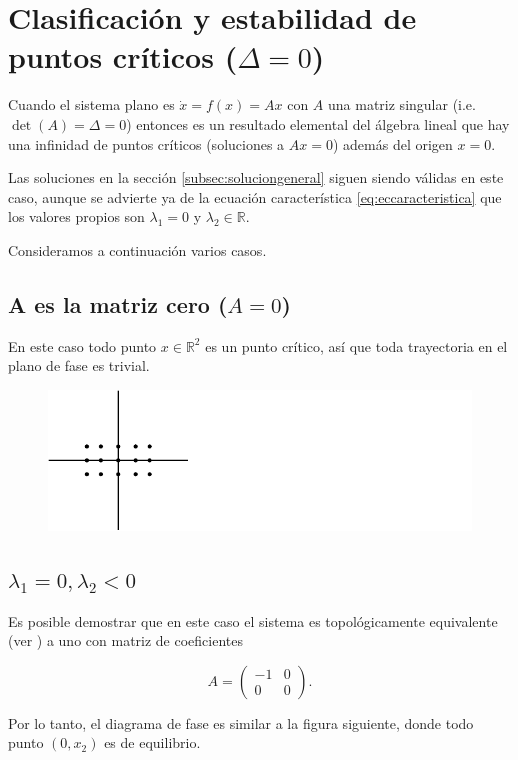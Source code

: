 \documentclass[11pt]{book}
\theoremstyle{definition}
\numberwithin{definition}{section}
\theoremstyle{theorem}
\numberwithin{theorem}{section}
\numberwithin{lemma}{section}
\numberwithin{corollary}{section}
\theoremstyle{plain}
\numberwithin{example}{section}
\newcommand{\R}{{\ensuremath{\mathbb{R}}}}
\begin{document}
\section{Clasificación y estabilidad de puntos críticos ($\Delta = 0$)}

Cuando el sistema plano es $\dot{x} = f(x) = Ax$ con $A$ una matriz singular (i.e. $\det(A) = \Delta = 0$) entonces es un resultado elemental del álgebra lineal que hay una infinidad de puntos críticos (soluciones a $Ax = 0$) además del origen $x = 0$.

Las soluciones en la sección \ref{subsec:soluciongeneral} siguen siendo válidas en este caso, aunque se advierte ya de la ecuación característica \ref{eq:eccaracteristica} que los valores propios son $\lambda_1 = 0$ y $\lambda_2 \in \R$.

Consideramos a continuación varios casos.

\subsection{A es la matriz cero ($A = 0$)}
En este caso todo punto $x \in \R^2$ es un punto crítico, así que toda trayectoria en el plano de fase es trivial.

\begin{figure}[!ht] \centering
    \includegraphics[scale=1.0]{figures/amatriz0.pdf}  
\end{figure}


\subsection{$\lambda_1 = 0, \lambda_2 < 0$}
Es posible demostrar que en este caso el sistema es topológicamente equivalente (ver \cite[p.~239]{dynandbif}) a uno con matriz de coeficientes

$$ A = \left( \begin{array}{ll} -1 & 0 \\ 0 & 0 \end{array} \right).$$

Por lo tanto, el diagrama de fase es similar a la figura siguiente, donde todo punto $(0,x_2)$ es de equilibrio.
\end{document}
